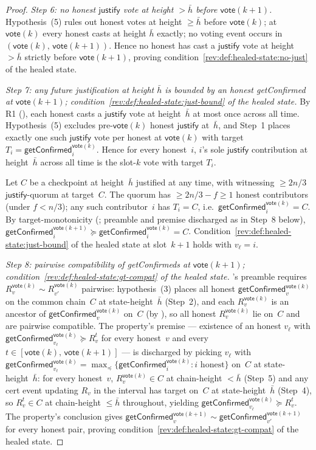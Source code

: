 \documentclass{article}
\newcommand{\just}{\ensuremath{\mathsf{justify}}\xspace}
\newcommand{\vote}{\mathsf{vote}}
\newcommand{\comm}[1]{\bar{#1}}
\newcommand{\getConfirmed}{\textsf{getConfirmed}\xspace}
\theoremstyle{plain}
\theoremstyle{definition}
\theoremstyle{remark}
\begin{document}
\begin{proof}
\emph{Step 6: no honest \just vote at height $> \comm{h}$ before $\vote(k+1)$.}
Hypothesis~(5) rules out honest votes at height $\geq \comm{h}$ before $\vote(k)$; at $\vote(k)$ every honest casts at height $\comm{h}$ exactly; no voting event occurs in $(\vote(k),\, \vote(k+1))$.
Hence no honest has cast a \just vote at height $> \comm{h}$ strictly before $\vote(k+1)$, proving condition~\ref{rev:def:healed-state:no-just} of the healed state.

\emph{Step 7: any future justification at height $\comm{h}$ is bounded by an honest \getConfirmed{} at $\vote(k+1)$; condition~\ref{rev:def:healed-state:just-bound} of the healed state.}
By R1 (), each honest casts a \just vote at height~$\comm{h}$ at most once across all time. Hypothesis~(5) excludes pre-$\vote(k)$ honest \just at~$\comm{h}$, and Step~1 places exactly one such \just vote per honest at $\vote(k)$ with target $T_i = \getConfirmed_i^{\vote(k)}$. Hence for every honest~$i$, $i$'s sole \just contribution at height~$\comm{h}$ across all time is the slot-$k$ vote with target $T_i$.

Let $C$ be a checkpoint at height~$\comm{h}$ justified at any time, with witnessing $\geq 2n/3$ \just-quorum at target~$C$. The quorum has $\geq 2n/3 - f \geq 1$ honest contributors (under $f < n/3$); any such contributor~$i$ has $T_i = C$, i.e.\ $\getConfirmed_i^{\vote(k)} = C$. By target-monotonicity (; preamble and premise discharged as in Step~8 below), $\getConfirmed_i^{\vote(k+1)} \succeq \getConfirmed_i^{\vote(k)} = C$. Condition~\ref{rev:def:healed-state:just-bound} of the healed state at slot~$k+1$ holds with $v_\ell = i$.

\emph{Step 8: pairwise compatibility of \getConfirmed{}s at $\vote(k+1)$; condition~\ref{rev:def:healed-state:gt-compat} of the healed state.}
's preamble requires $R_v^{\vote(k)} \sim R_{v'}^{\vote(k)}$ pairwise: hypothesis~(3) places all honest $\getConfirmed_v^{\vote(k)}$ on the common chain~$C$ at state-height~$\comm{h}$ (Step~2), and each $R_v^{\vote(k)}$ is an ancestor of $\getConfirmed_v^{\vote(k)}$ on~$C$ (by ), so all honest $R_v^{\vote(k)}$ lie on~$C$ and are pairwise compatible.
The property's premise — existence of an honest $v_\ell$ with $\getConfirmed_{v_\ell}^{\vote(k)} \succeq R_v^t$ for every honest~$v$ and every $t \in [\vote(k),\, \vote(k+1)]$ — is discharged by picking $v_\ell$ with $\getConfirmed_{v_\ell}^{\vote(k)} = \max_\preceq \{\getConfirmed_i^{\vote(k)} : i \text{ honest}\}$ on~$C$ at state-height~$\comm{h}$: for every honest~$v$, $R_v^{\vote(k)} \in C$ at chain-height $< \comm{h}$ (Step~5) and any cert event updating $R_v$ in the interval has target on~$C$ at state-height~$\comm{h}$ (Step~4), so $R_v^t \in C$ at chain-height $\leq \comm{h}$ throughout, yielding $\getConfirmed_{v_\ell}^{\vote(k)} \succeq R_v^t$.
The property's conclusion gives $\getConfirmed_v^{\vote(k+1)} \sim \getConfirmed_{v'}^{\vote(k+1)}$ for every honest pair, proving condition~\ref{rev:def:healed-state:gt-compat} of the healed state.


\end{proof}
\end{document}
